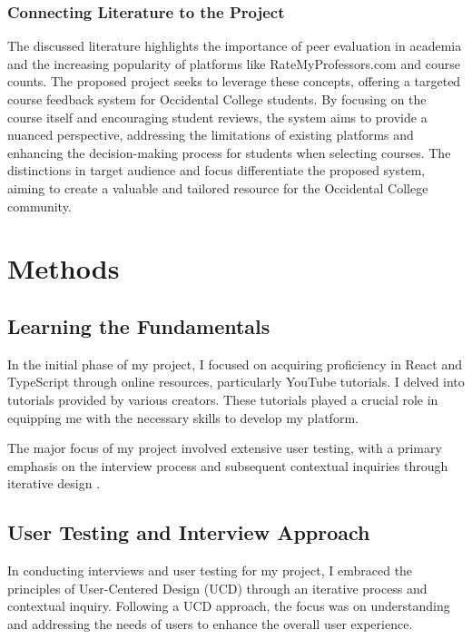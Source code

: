 \documentclass[10pt,twocolumn]{article}
\begin{document}
\subsubsection{Connecting Literature to the Project}
The discussed literature highlights the importance of peer evaluation in academia and the increasing popularity of platforms like RateMyProfessors.com and course counts. The proposed project seeks to leverage these concepts, offering a targeted course feedback system for Occidental College students. By focusing on the course itself and encouraging student reviews, the system aims to provide a nuanced perspective, addressing the limitations of existing platforms and enhancing the decision-making process for students when selecting courses. The distinctions in target audience and focus differentiate the proposed system, aiming to create a valuable and tailored resource for the Occidental College community.


\section{Methods}

\subsection{Learning the Fundamentals}
In the initial phase of my project, I focused on acquiring proficiency in React and TypeScript through online resources, particularly YouTube tutorials. I delved into tutorials provided by various creators. These tutorials played a crucial role in equipping me with the necessary skills to develop my platform.

The major focus of my project involved extensive user testing, with a primary emphasis on the interview process and subsequent contextual inquiries through iterative design \cite{mao2005}.

\subsection{User Testing and Interview Approach}
In conducting interviews and user testing for my project, I embraced the principles of User-Centered Design (UCD) through an iterative process and contextual inquiry. Following a UCD approach, the focus was on understanding and addressing the needs of users to enhance the overall user experience.
\end{document}
